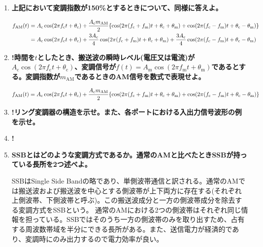 \documentclass[10pt]{jsarticle}
\begin{document}
\begin{enumerate}
\item\textbf{上記において変調指数が150\%とするときについて、同様に答えよ。}

\begin{align}
f_\mathrm{AM}(t)&=A_\mathrm{c}\cos(2\pi f_\mathrm{c} t + \theta_\mathrm{c}) + \frac{A_\mathrm{c}m_\mathrm{AM}}{2}\{\cos(2 \pi (f_\mathrm{c} + f_\mathrm{m}) t+ \theta_\mathrm{c} + \theta_\mathrm{m}) + \cos(2 \pi (f_\mathrm{c} - f_\mathrm{m}) t+ \theta_\mathrm{c} - \theta_\mathrm{m})\}\notag\\
&=A_\mathrm{c}\cos(2\pi f_\mathrm{c} t + \theta_\mathrm{c}) + \frac{3A_\mathrm{c}}{4}\cos(2 \pi (f_\mathrm{c} + f_\mathrm{m}) t+ \theta_\mathrm{c} + \theta_\mathrm{m}) + \frac{3A_\mathrm{c}}{4}\cos(2 \pi (f_\mathrm{c} - f_\mathrm{m}) t+ \theta_\mathrm{c} - \theta_\mathrm{m})
\end{align}

\item\textbf{!時間を$t$としたとき、搬送波の瞬時レベル(電圧又は電流)が$A_\mathrm{c}\cos(2\pi f_\mathrm{c} t + \theta_\mathrm{c})$、変調信号が$f(t) = A_\mathrm{m}\cos(2\pi f_\mathrm{m} t + \theta_\mathrm{m})$であるとする。変調指数が$m_\mathrm{AM}$であるときのAM信号を数式で表現せよ。}

\begin{align}
f_\mathrm{AM}(t)&=A_\mathrm{c}\cos(2\pi f_\mathrm{c} t + \theta_\mathrm{c}) + \frac{A_\mathrm{c}m_\mathrm{AM}}{2}\{\cos(2 \pi (f_\mathrm{c} + f_\mathrm{m}) t+ \theta_\mathrm{c} + \theta_\mathrm{m}) + \cos(2 \pi (f_\mathrm{c} - f_\mathrm{m}) t+ \theta_\mathrm{c} - \theta_\mathrm{m})\}\notag\\
\end{align}

\item\textbf{!リング変調器の構造を示せ。また、各ポートにおける入出力信号波形の例を示せ。}



\item\textbf{!}



\item\textbf{SSBとはどのような変調方式であるか。通常のAMと比べたときSSBが持っている長所を2つ述べよ。}

SSBはSingle Side Bandの略であり、単側波帯通信と訳される。通常のAMでは搬送波および搬送波を中心とする側波帯が上下両方に存在する(それぞれ上側波帯、下側波帯と呼ぶ)。この搬送波成分と一方の側波帯成分を除去する変調方式をSSBという。
通常のAMにおける2つの側波帯はそれぞれ同じ情報を担っている。SSBではそのうち一方の側波帯のみを取り出すため、占有する周波数帯域を半分にできる長所がある。また、送信電力が経済的であり、変調時にのみ出力するので電力効率が良い。


\end{enumerate}
\end{document}
